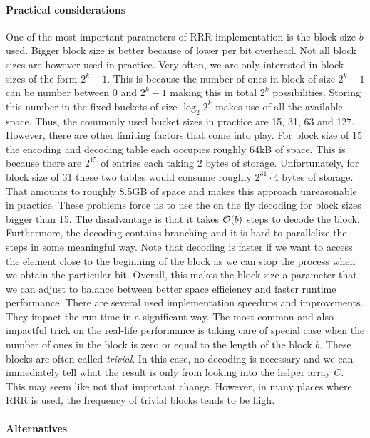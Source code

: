 \paragraph{Practical considerations}
\label{subsection:block_size}

One of the most important parameters of RRR implementation is the block
size $b$ used. Bigger block size is better because of lower per bit overhead. Not
all block sizes are however used in practice. Very often, we are only interested in
block sizes of the form $2^k-1$. This is because the number of ones in block of size $2^k-1$
can be number between 0 and $2^k-1$ making this in total $2^k$ possibilities. Storing
this number in the fixed buckets of size $\log_2 2^k$ makes use of all the available space.
Thus, the commonly used bucket sizes in practice are 15, 31, 63 and 127. However, there are
other limiting factors that come into play. For block size of 15 the encoding and decoding table
each occupies roughly 64kB of space. This is because there are $2^{15}$ of entries each taking
2 bytes of storage. Unfortunately, for block size of 31 these two tables would consume roughly
$2^{31}\cdot 4$ bytes of storage. That amounts to roughly 8.5GB of space and makes this approach
unreasonable in practice. These problems force us to use the on the fly decoding for block sizes
bigger than 15. The disadvantage is that it takes $\mathcal{O}(b)$ steps to decode the block. Furthermore,
the decoding contains branching and it is hard to parallelize the steps in some meaningful way.
Note that decoding is faster if we want to access the element close to the beginning of
the block as we can stop the process when we obtain the particular bit. Overall, this makes the block
size a parameter that we can adjust to balance between better space efficiency and faster
runtime performance. There are several used implementation speedups and improvements. They impact
the run time in a significant way. The most common and also impactful trick on the real-life
performance is taking care of special case when the number of ones in the block
is zero or equal to the length of the block $b$. These blocks are often called \textit{trivial}. 
In this case, no decoding is necessary and we can immediately tell what the result is only from
looking into the helper array $C$. This may seem like not that important change. However, in many
places where RRR is used, the frequency of trivial blocks tends to be high.

\paragraph{Alternatives}

